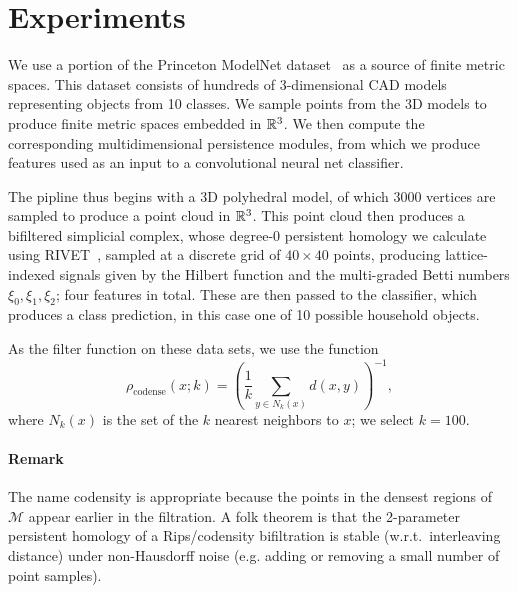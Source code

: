 \documentclass{article}
\begin{document}
\section{Experiments}
We use a portion of the Princeton ModelNet
dataset~\cite{zhirong_wu_3d_2015} as a source of finite
metric spaces. This dataset consists of hundreds of 3-dimensional CAD models
representing objects from 10 classes. We sample
points from the 3D models to produce finite metric spaces embedded in $\mathbb{R}^3$.
We then compute the corresponding multidimensional persistence modules, from
which we produce features used as an input to a convolutional neural net
classifier.

The pipline thus begins with a 3D polyhedral model, of which $3000$ vertices are
sampled to produce a point cloud in $\mathbb{R}^3$. This point cloud then produces a
bifiltered simplicial complex, whose degree-$0$ persistent homology we calculate
using RIVET~\cite{lesnick_interactive_2015}, sampled at a discrete grid of $40
\times 40$ points, producing lattice-indexed signals given by the Hilbert
function and the multi-graded Betti numbers $\xi_0, \xi_1, \xi_2$; four features
in total. These are then passed to the classifier, which produces a class
prediction, in this case one of 10 possible household objects.

As the filter function on these data sets, we use the  function \[\rho_{\text{codense}}(x;k) = \left( \frac{1}{k} \sum_{y \in N_k(x)} d(x,y) \right)^{-1},\]
where $N_k(x)$ is the set of the $k$ nearest neighbors to $x$; we select
$k=100$.
\paragraph{Remark}
The name codensity is appropriate because the points in the densest
regions of $\mathcal M$ appear earlier in the filtration. A folk theorem is that
the 2-parameter persistent homology of a Rips/codensity bifiltration is stable (w.r.t.~interleaving distance)
under non-Hausdorff noise (e.g. adding or removing a small number of point samples).
\end{document}
